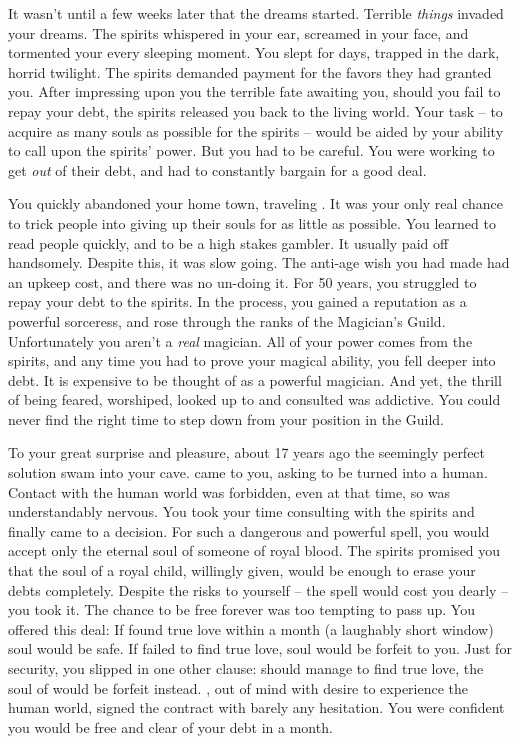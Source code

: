 \documentclass[char]{NeptuneBall}
\begin{document}
It wasn't until a few weeks later that the dreams started. Terrible \emph{things} invaded your dreams. The spirits whispered in your ear, screamed in your face, and tormented your every sleeping moment. You slept for days, trapped in the dark, horrid twilight. The spirits demanded payment for the favors they had granted you. After impressing upon you the terrible fate awaiting you, should you fail to repay your debt, the spirits released you back to the living world. Your task -- to acquire as many souls as possible for the spirits -- would be aided by your ability to call upon the spirits' power. But you had to be careful. You were working to get \emph{out} of their debt, and had to constantly bargain for a good deal.

You quickly abandoned your home town, traveling \pAtlantis{}. It was your only real chance to trick people into giving up their souls for as little as possible. You learned to read people quickly, and to be a high stakes gambler. It usually paid off handsomely. Despite this, it was slow going. The anti-age wish you had made had an upkeep cost, and there was no un-doing it. For 50 years, you struggled to repay your debt to the spirits. In the process, you gained a reputation as a powerful sorceress, and rose through the ranks of the Magician's Guild. Unfortunately you aren't a \emph{real} magician. All of your power comes from the spirits, and any time you had to prove your magical ability, you fell deeper into debt. It is expensive to be thought of as a powerful magician. And yet, the thrill of being feared, worshiped, looked up to and consulted was addictive. You could never find the right time to step down from your position in the Guild.

To your great surprise and pleasure, about 17 years ago the seemingly perfect solution swam into your cave. \cAriel{\Prince} \cAriel{} came to you, asking to be turned into a human. Contact with the human world was forbidden, even at that time, so \cAriel{} was understandably nervous. You took your time consulting with the spirits and finally came to a decision. For such a dangerous and powerful spell, you would accept only the eternal soul of someone of royal blood. The spirits promised you that the soul of a royal child, willingly given, would be enough to erase your debts completely. Despite the risks to yourself -- the spell would cost you dearly -- you took it. The chance to be free forever was too tempting to pass up. You offered \cAriel{} this deal: If \cAriel{\they} found true love within a month (a laughably short window) \cAriel{\their} soul would be safe. If \cAriel{} failed to find true love, \cAriel{\their} soul would be forfeit to you. Just for security, you slipped in one other clause: should \cAriel{} manage to find true love, the soul of \cAriel{\their} \cWillow{\nextborn} would be forfeit instead. \cAriel{}, out of \cAriel{\their} mind with desire to experience the human world, signed the contract with barely any hesitation. You were confident you would be free and clear of your debt in a month.
\end{document}
